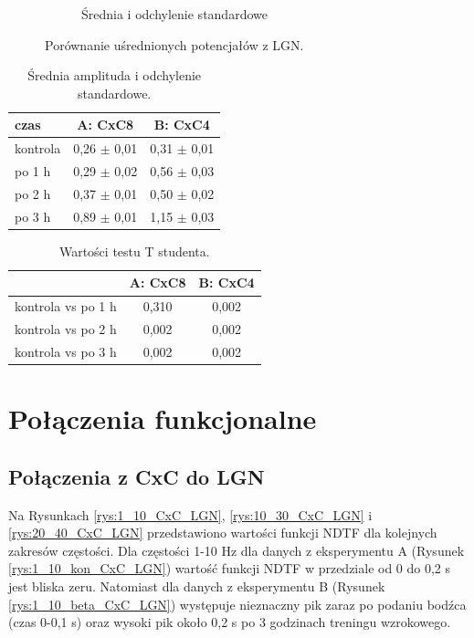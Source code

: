 \documentclass{pracamgr_2}
\begin{document}
\begin{figure}[h]
\begin{subfigure}{.43\textwidth}
		\caption{Średnia i odchylenie standardowe}
		\label{rys:porow_stat_LGN}
	\end{subfigure}
	\caption{Porównanie uśrednionych potencjałów z LGN.}
	\label{rys:porownanie_LGN}
	
\end{figure}
\begin{table}[htdp]
	\caption{Średnia amplituda i odchylenie standardowe.}
	\begin{center}
		\begin{tabularx}{0.6\textwidth}{l C C }
			\toprule
			\textbf{czas} & \textbf{A: CxC8} & \textbf{B: CxC4}\\
			\midrule
			kontrola & 0,26 $\pm$ 0,01 & 0,31 $\pm$	0,01 \\
			po 1 h & 0,29 $\pm$	0,02 & 0,56 $\pm$ 0,03 \\
			po 2 h & 0,37 $\pm$ 0,01 & 0,50 $\pm$ 0,02\\
			po 3 h & 0,89 $\pm$ 0,01 & 1,15	$\pm$ 0,03\\
			\bottomrule
		\end{tabularx}
	\end{center}
	\label{tab:porow_stat_LGN}
\end{table}

\begin{table}[htdp]
	\caption{Wartości testu T studenta.}
	\begin{center}
		\begin{tabularx}{0.5\textwidth}{l C C}
			\toprule
			\textbf{} & \textbf{A: CxC8} & \textbf{B: CxC4}\\
			\midrule
			kontrola vs po 1 h & 0,310 & 0,002 \\
			kontrola vs po 2 h & 0,002 & 0,002\\
			kontrola vs po 3 h & 0,002 & 0,002\\
			\bottomrule
		\end{tabularx}
	\end{center}
	\label{tab:beta_test_T}
\end{table}

\section{Połączenia funkcjonalne}
\subsection{Połączenia z CxC do LGN}
Na Rysunkach \ref{rys:1_10_CxC_LGN}, \ref{rys:10_30_CxC_LGN} i \ref{rys:20_40_CxC_LGN} przedstawiono wartości funkcji NDTF dla kolejnych zakresów częstości. Dla częstości 1-10 Hz dla danych z eksperymentu A (Rysunek \ref{rys:1_10_kon_CxC_LGN}) wartość funkcji NDTF w przedziale od 0 do 0,2 s jest bliska zeru. Natomiast dla danych z eksperymentu B (Rysunek \ref{rys:1_10_beta_CxC_LGN}) występuje  nieznaczny pik zaraz po podaniu bodźca (czas 0-0,1 s) oraz wysoki pik około 0,2 s po 3 godzinach treningu wzrokowego. 
\end{document}
